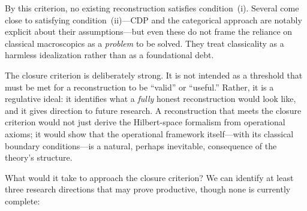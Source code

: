 \documentclass[12pt,a4paper,twoside]{article}
\begin{document}
By this criterion, no existing reconstruction satisfies condition~(i). Several come close to satisfying condition~(ii)---CDP and the categorical approach are notably explicit about their assumptions---but even these do not frame the reliance on classical macroscopics as a \emph{problem} to be solved. They treat classicality as a harmless idealization rather than as a foundational debt.

The closure criterion is deliberately strong. It is not intended as a threshold that must be met for a reconstruction to be ``valid'' or ``useful.'' Rather, it is a regulative ideal: it identifies what a \emph{fully} honest reconstruction would look like, and it gives direction to future research. A reconstruction that meets the closure criterion would not just derive the Hilbert-space formalism from operational axioms; it would show that the operational framework itself---with its classical boundary conditions---is a natural, perhaps inevitable, consequence of the theory's structure.

What would it take to approach the closure criterion? We can identify at least three research directions that may prove productive, though none is currently complete:
\end{document}
